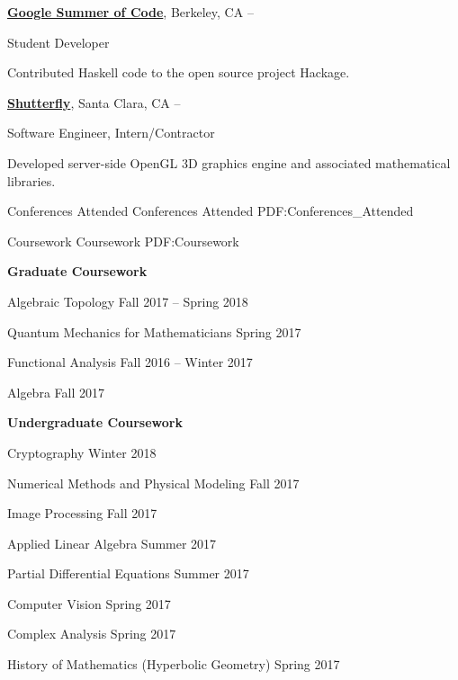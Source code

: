 \documentclass[letterpaper,MMMyyyy,nonstopmode]{simpleresumecv}
\begin{document}
\begin{Body}
\BigGap
\Entry
\href{https://summerofcode.withgoogle.com/archive/}
{\textbf{Google Summer of Code}},
Berkeley, CA
\hfill
{} --

\Gap
\BulletItem
Student Developer

\begin{Detail}
\SubBulletItem
Contributed Haskell code to the open source project Hackage.
\end{Detail}


\BigGap
\Entry
\href{http://www.shutterfly.com/}
{\textbf{Shutterfly}},
Santa Clara, CA
\hfill
{} --

\Gap
\BulletItem
Software Engineer, Intern/Contractor
\begin{Detail}
\SubBulletItem
Developed server-side OpenGL 3D graphics engine and associated mathematical libraries.
\end{Detail}

\Section
{Conferences Attended}
{Conferences Attended}
{PDF:Conferences_Attended}


\Section
{Coursework}
{Coursework}
{PDF:Coursework}

\textbf{Graduate Coursework}

\BulletItem
Algebraic Topology
\hfill Fall 2017 -- Spring 2018

\BulletItem
Quantum Mechanics for Mathematicians
\hfill Spring 2017

\BulletItem
Functional Analysis
\hfill Fall 2016 -- Winter 2017

\BulletItem
Algebra
\hfill Fall 2017
\BigGap

\textbf{Undergraduate Coursework}

\BulletItem
Cryptography
\hfill Winter 2018

\BulletItem
Numerical Methods and Physical Modeling
\hfill Fall 2017

\BulletItem
Image Processing
\hfill Fall 2017

\BigGap
\BulletItem
Applied Linear Algebra
\hfill Summer 2017

\BulletItem
Partial Differential Equations
\hfill Summer 2017

\BulletItem
Computer Vision
\hfill Spring 2017

\BulletItem
Complex Analysis
\hfill Spring 2017

\BulletItem
History of Mathematics (Hyperbolic Geometry)
\hfill Spring 2017


\end{Body}
\end{document}
